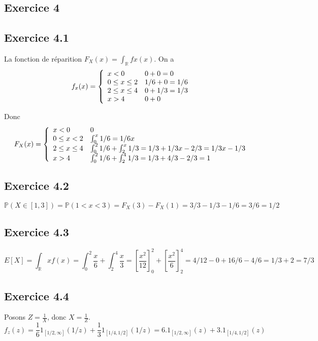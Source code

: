 \documentclass[]{book}
\theoremstyle{definition}
\newcommand{\bb}[1]{\mathbb{#1}}
\newcommand{\R}{\bb{R}}
\newcommand{\Pe}{\bb{P}}
\begin{document}
\subsection*{Exercice 4}
\subsection*{Exercice 4.1}
La fonction de r\'eparition $F_X(x) = \int_{\R}fx(x)$. On a 
$$
f_x(x) =
\left\{
    \begin{array}{l l}
        x < 0 &  0 + 0 = 0 \\
        0 \leq x \leq 2 &  1/6 + 0 = 1/6 \\
        2 \leq x \leq 4 & 0 + 1/3 = 1/3 \\
        x > 4 & 0 + 0
    \end{array}
\right.
$$

Donc
$$
F_X(x) =
\left\{
    \begin{array}{l l}
        x < 0 &  0 \\
        0 \leq x < 2 & \int_{0}^{x}{1/6} = 1/6x \\
        2 \leq x \leq 4 & \int_{0}^{2}{1/6} + \int_{2}^{x}{1/3} = 1/3+1/3x-2/3 = 1/3x-1/3\\
        x > 4 & \int_{0}^{2}{1/6} + \int_{2}^{4}{1/3} = 1/3 + 4/3-2/3 = 1
    \end{array}
\right.
$$

\subsection*{Exercice 4.2}
$$
\Pe(X \in [1,3]) = \Pe(1<x<3) = F_X(3) - F_X(1) = 3/3 - 1/3 -1/6 = 3/6 = 1/2
$$

\subsection*{Exercice 4.3}
$$
E[X] = \int_{\R}xf(x) = \int_0^2{\frac{x}{6} + \int_2^4\frac{x}{3} = \left[\frac{x^2}{12}\right]_0^2 + \left[\frac{x^2}{6}\right]_2^4} = 4/12 - 0 + 16/6 - 4/6 = 1/3+2 = 7/3
$$


\subsection*{Exercice 4.4}
Posons $Z = \frac{1}{X}$, donc $X=\frac{1}{Z}$.
$$
f_z(z) = \frac{1}{6}1_{[1/2, \infty]}(1/z) + \frac{1}{3}1_{[1/4, 1/2]}(1/z) = 6.1_{[1/2, \infty]}(z) + 3.1_{[1/4, 1/2]}(z)
$$
\end{document}
